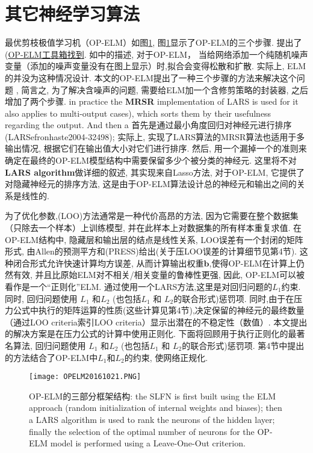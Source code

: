 \section{其它神经学习算法}
最优剪枝极值学习机（OP-ELM）如图\ref{OPELM20161021fig2}, 图\ref{OPELM20161021fig2}显示了OP-ELM的三个步骤.
提出了 (\href{http://www.cis.hut.fi/projects/eiml/research/download}{OP-ELM工具箱找到}.
如\cite{Miche2008OP, Miche2008A, Miche2010OP}中的描述, 对于OP-ELM， 当给网络添加一个纯随机噪声变量（添加的噪声变量没有在图上显示）时,拟合会变得松散和扩散.
实际上, ELM的并没为这种情况设计. 本文的OP-ELM提出了一种三个步骤的方法来解决这个问题 , 简言之, 为了解决含噪声的问题, 需要给ELM加一个含修剪策略的封装器, 之后增加了两个步骤.
in practice the \textbf{MRSR} \cite{SimiläTikka2005-32497} implementation of LARS is used for it also applies to multi-output cases), which sorts them by their usefulness regarding the output. And then a
首先是通过最小角度回归对神经元进行排序(LARS{efronhaste2004-32498}); 实际上, 实现了LARS算法的MRSR算法也适用于多输出情况, 根据它们在输出值大小对它们进行排序. 然后, 用一个漏掉一个的准则来确定在最终的OP-ELM模型结构中需要保留多少个被分类的神经元.
这里将不对\textbf{LARS algorithm}做详细的叙述, 其实现来自Lasso方法, 对于OP-ELM, 它提供了对隐藏神经元的排序方法,
这是由于OP-ELM算法设计总的神经元和输出之间的关系是线性的.

为了优化参数,(LOO)方法通常是一种代价高昂的方法, 因为它需要在整个数据集（只除去一个样本）上训练模型, 并在此样本上对数据集的所有样本重复求值.
在OP-ELM结构中, 隐藏层和输出层的结点是线性关系, LOO误差有一个封闭的矩阵形式, 由Allen的预测平方和(PRESS)给出(关于压LOO误差的计算细节见第4节). 这种闭合形式允许快速计算均方误差, 从而计算输出权重$\bm b$,使得OP-ELM在计算上仍然有效, 并且比原始ELM对不相关/相关变量的鲁棒性更强, 因此, OP-ELM可以被看作是一个“正则化”ELM.
通过使用一个{LARS}方法,这里是对回归问题的$L_1$约束.
同时, 回归问题使用 $L_1$ 和$L_2$ (也包括$L_1$ 和 $L_2$的联合形式)惩罚项.
同时,由于在压力公式中执行的矩阵运算的性质(这些计算见第4节),决定保留的神经元的最终数量（通过{LOO criteria}索引{LOO criteria}）显示出潜在的不稳定性（数值）.
本文提出的解决方案是在压力公式的计算中使用正则化.
下面将回顾用于执行正则化的最著名算法, 回归问题使用 $L_1$ 和$L_2$ (也包括$L_1$ 和 $L_2$的联合形式)惩罚项.
第4节中提出的方法结合了OP-ELM中$L_1$和$L_2$的约束, 使网络正规化.
\begin{figure}[t]
\begin{center}
\texttt{[image: OPELM20161021.PNG]}
\end{center}
\caption{OP-ELM的三部分框架结构: the SLFN is first built using the ELM approach (random initialization of internal weights and biases); then a LARS algorithm is
used to rank the neurons of the hidden layer; finally the selection of the optimal number of neurons for the OP-ELM model is performed using a Leave-One-Out criterion.}
\label{OPELM20161021fig2}
\end{figure}
